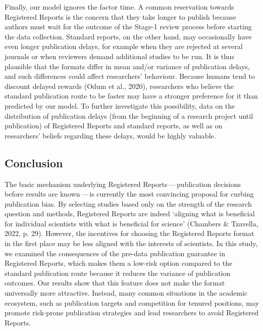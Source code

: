 \documentclass[
  british,
  a4paper,
  ,man,mask,floatsintext]{apa6}
\begin{document}
Finally, our model ignores the factor time.
A common reservation towards Registered Reports is the concern that they take longer to publish because authors must wait for the outcome of the Stage-1 review process before starting the data collection.
Standard reports, on the other hand, may occasionally have even longer publication delays, for example when they are rejected at several journals or when reviewers demand additional studies to be run.
It is thus plausible that the formats differ in mean and/or variance of publication delays, and such differences could affect researchers' behaviour.
Because humans tend to discount delayed rewards (Odum et al., 2020), researchers who believe the standard publication route to be faster may have a stronger preference for it than predicted by our model.
To further investigate this possibility, data on the distribution of publication delays (from the beginning of a research project until publication) of Registered Reports and standard reports, as well as on researchers' beliefs regarding these delays, would be highly valuable.

\subsection{Conclusion}\label{conclusion}

The basic mechanism underlying Registered Reports\(\,\)---\(\,\)publication decisions before results are known\(\,\)---\(\,\)is currently the most convincing proposal for curbing publication bias.
By selecting studies based only on the strength of the research question and methods, Registered Reports are indeed `aligning what is beneficial for individual scientists with what is beneficial for science' (Chambers \& Tzavella, 2022, p. 29).
However, the incentives for choosing the Registered Reports format in the first place may be less aligned with the interests of scientists.
In this study, we examined the consequences of
the pre-data publication guarantee in Registered Reports, which makes them a low-risk option compared to the standard publication route because it reduces the variance of publication outcomes.
Our results show that this feature does not make the format universally more attractive.
Instead, many common situations in the academic ecosystem, such as publication targets and competition for tenured positions, may promote risk-prone publication strategies and lead researchers to avoid Registered Reports.
\end{document}
